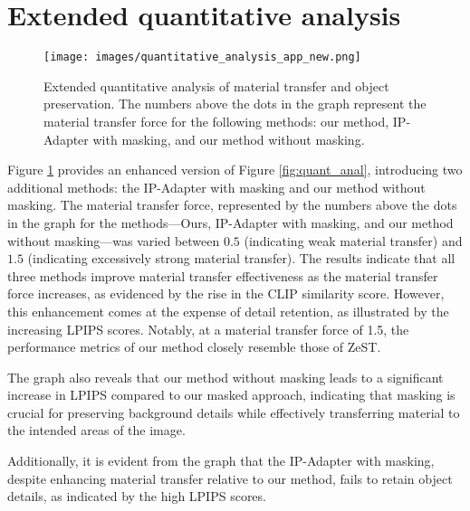 \section{Extended quantitative analysis}
\label{appendix:quant_anal}
\begin{figure}[t!]
  \centering
   \vspace{3pt}
   \texttt{[image: images/quantitative\_analysis\_app\_new.png]}

   \caption{Extended quantitative analysis of material transfer and object preservation. The numbers above the dots in the graph represent the material transfer force for the following methods: our method, IP-Adapter with masking, and our method without masking.}
   \label{fig:quant_anal_all}

\end{figure}
Figure \ref{fig:quant_anal_all} provides an enhanced version of Figure \ref{fig:quant_anal}, introducing two additional methods: the IP-Adapter with masking and our method without masking. The material transfer force, represented by the numbers above the dots in the graph for the methods—Ours, IP-Adapter with masking, and our method without masking—was varied between $0.5$ (indicating weak material transfer) and $1.5$ (indicating excessively strong material transfer). The results indicate that all three methods improve material transfer effectiveness as the material transfer force increases, as evidenced by the rise in the CLIP similarity score. However, this enhancement comes at the expense of detail retention, as illustrated by the increasing LPIPS scores. Notably, at a material transfer force of 1.5, the performance metrics of our method closely resemble those of ZeST.

The graph also reveals that our method without masking leads to a significant increase in LPIPS compared to our masked approach, indicating that masking is crucial for preserving background details while effectively transferring material to the intended areas of the image.

Additionally, it is evident from the graph that the IP-Adapter with masking, despite enhancing material transfer relative to our method, fails to retain object details, as indicated by the high LPIPS scores.


